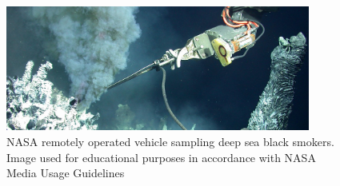 \documentclass[applsci,article,submit,pdftex,moreauthors]{Definitions/mdpi}
\begin{document}

\begin{figure}[h]
  \widefigure
\includegraphics[width=10cm]{NASA Smoker subsampling-2.jpg}
\caption{NASA remotely operated vehicle sampling deep sea black smokers.\cite{Gronstal22} Image used for educational purposes in accordance with NASA Media Usage Guidelines \cite{NASA22}}
\label{fig:NASA Smoker subsampling-2}
\end{figure}
\end{document}
